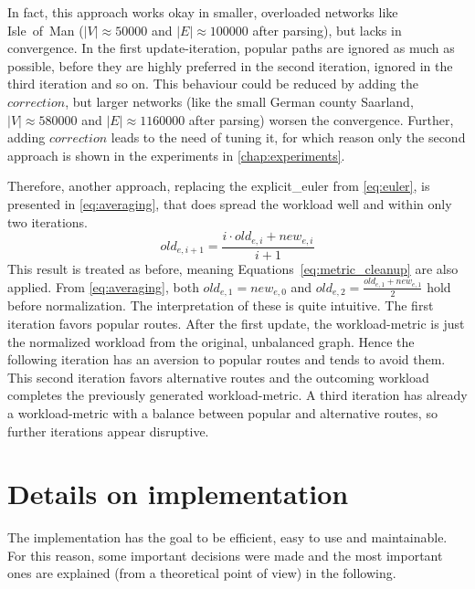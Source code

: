         In fact, this approach works okay in smaller, overloaded networks like Isle~of~Man ($|V| \approx \num{50000}$ and $|E| \approx \num{100000}$ after parsing), but lacks in convergence.
        In the first update-iteration, popular paths are ignored as much as possible, before they are highly preferred in the second iteration, ignored in the third iteration and so on.
        This behaviour could be reduced by adding the $\mathit{correction}$, but larger networks (like the small German county Saarland, $|V| \approx \num{580000}$ and $|E| \approx \num{1160000}$ after parsing) worsen the convergence.
        Further, adding $\mathit{correction}$ leads to the need of tuning it, for which reason only the second approach is shown in the experiments in \vref{chap:experiments}.

        Therefore, another approach, replacing the \gls{explicit_euler} from \vref{eq:euler}, is presented in \vref{eq:averaging}, that does spread the workload well and within only two iterations.
        \begin{equation}
        \label{eq:averaging}
            \mathit{old}_{e,i+1} = \frac{i \cdot \mathit{old}_{e,i} + \mathit{new}_{e,i}}{i+1}
        \end{equation}
        This result is treated as before, meaning Equations~\ref{eq:metric_cleanup} are also applied.
        From \vref{eq:averaging}, both $\mathit{old}_{e,1}=\mathit{new}_{e,0}$ and $\mathit{old}_{e,2}=\frac{\mathit{old}_{e,1} + \mathit{new}_{e,1}}{2}$ hold before normalization.
        The interpretation of these is quite intuitive.
        The first iteration favors popular routes.
        After the first update, the workload-\gls{metric} is just the normalized workload from the original, unbalanced graph.
        Hence the following iteration has an aversion to popular routes and tends to avoid them.
        This second iteration favors alternative routes and the outcoming workload completes the previously generated workload-\gls{metric}.
        A third iteration has already a workload-\gls{metric} with a balance between popular and alternative routes, so further iterations appear disruptive.

\section{Details on implementation}
\label{chap:balancing:implementation}

    The implementation has the goal to be efficient, easy to use and maintainable.
    For this reason, some important decisions were made and the most important ones are explained (from a theoretical point of view) in the following.

